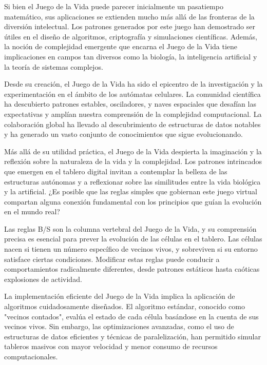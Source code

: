 \documentclass{article}
\begin{document}
	Si bien el Juego de la Vida puede parecer inicialmente un pasatiempo matemático, sus aplicaciones se extienden mucho más allá de las fronteras de la diversión intelectual. Los patrones generados por este juego han demostrado ser útiles en el diseño de algoritmos, criptografía y simulaciones científicas. Además, la noción de complejidad emergente que encarna el Juego de la Vida tiene implicaciones en campos tan diversos como la biología, la inteligencia artificial y la teoría de sistemas complejos.
	
	Desde su creación, el Juego de la Vida ha sido el epicentro de la investigación y la experimentación en el ámbito de los autómatas celulares. La comunidad científica ha descubierto patrones estables, osciladores, y naves espaciales que desafían las expectativas y amplían nuestra comprensión de la complejidad computacional. La colaboración global ha llevado al descubrimiento de estructuras de datos notables y ha generado un vasto conjunto de conocimientos que sigue evolucionando.
	
	Más allá de su utilidad práctica, el Juego de la Vida despierta la imaginación y la reflexión sobre la naturaleza de la vida y la complejidad. Los patrones intrincados que emergen en el tablero digital invitan a contemplar la belleza de las estructuras autónomas y a reflexionar sobre las similitudes entre la vida biológica y la artificial. ¿Es posible que las reglas simples que gobiernan este juego virtual compartan alguna conexión fundamental con los principios que guían la evolución en el mundo real?
	
	Las reglas B/S son la columna vertebral del Juego de la Vida, y su comprensión precisa es esencial para prever la evolución de las células en el tablero. Las células nacen si tienen un número específico de vecinos vivos, y sobreviven si su entorno satisface ciertas condiciones. Modificar estas reglas puede conducir a comportamientos radicalmente diferentes, desde patrones estáticos hasta caóticas explosiones de actividad.
	
	La implementación eficiente del Juego de la Vida implica la aplicación de algoritmos cuidadosamente diseñados. El algoritmo estándar, conocido como "vecinos contados", evalúa el estado de cada célula basándose en la cuenta de sus vecinos vivos. Sin embargo, las optimizaciones avanzadas, como el uso de estructuras de datos eficientes y técnicas de paralelización, han permitido simular tableros masivos con mayor velocidad y menor consumo de recursos computacionales.
	
\end{document}
